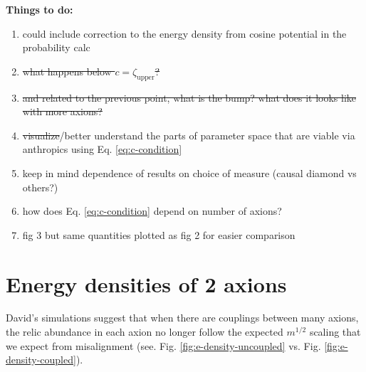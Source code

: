 \documentclass{article}
\begin{document}
\break
\color{red}\noindent \textbf{Things to do:}
\begin{enumerate}
    \item could include correction to the energy density from cosine potential in the probability calc
    \item \st{what happens below $c=\zeta_\text{upper}$?}
    \item \st{and related to the previous point, what is the bump? what does it looks like with more axions?}
    \item \st{visualize}/better understand the parts of parameter space that are viable via anthropics using Eq. \eqref{eq:c-condition}
    \item keep in mind dependence of results on choice of measure (causal diamond vs others?)
    \item how does Eq. \eqref{eq:c-condition} depend on number of axions?
    \item fig 3 but same quantities plotted as fig 2 for easier comparison
\end{enumerate}\color{black}

\section{Energy densities of 2 axions}

David's simulations suggest that when there are couplings between many axions, the relic abundance in each axion no longer follow the expected $m^{1/2}$ scaling that we expect from misalignment (see. Fig. \ref{fig:e-density-uncoupled} vs. Fig. \ref{fig:e-density-coupled}).
\end{document}
